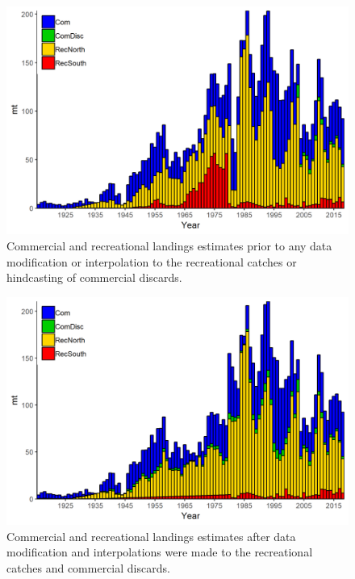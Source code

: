 \documentclass[12pt,]{article}
\begin{document}
\begin{figure}
\centering
\includegraphics{Figures/Catches_original.png}
\caption{Commercial and recreational landings estimates prior to any
data modification or interpolation to the recreational catches or
hindcasting of commercial discards. \label{fig:Catches_original}}
\end{figure}

\begin{figure}
\centering
\includegraphics{Figures/Catches_alternate.png}
\caption{Commercial and recreational landings estimates after data
modification and interpolations were made to the recreational catches
and commercial discards. \label{fig:Catches_alternate}}
\end{figure}
\end{document}
